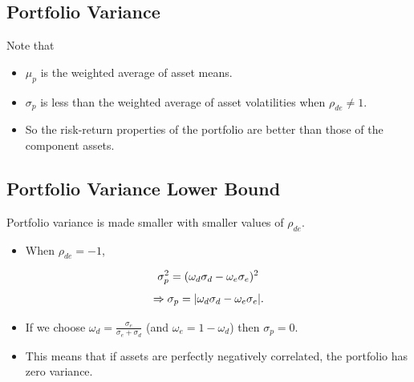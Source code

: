 \documentclass[letterpaper,10pt,english]{sphinxmanual}
\begin{document}
\subsection{Portfolio Variance}
\label{portfolioOpt:id4}
Note that
\begin{itemize}
\item {} 
$\mu_p$ is the weighted average of asset means.

\end{itemize}
\begin{itemize}
\item {} 
$\sigma_p$ is less than the weighted average of asset
volatilities when $\rho_{de} \neq 1$.

\end{itemize}
\begin{itemize}
\item {} 
So the risk-return properties of the portfolio are better than those
of the component assets.

\end{itemize}


\subsection{Portfolio Variance Lower Bound}
\label{portfolioOpt:portfolio-variance-lower-bound}
Portfolio variance is made smaller with smaller values of
$\rho_{de}$.
\begin{itemize}
\item {} 
When $\rho_{de} = -1$,

\end{itemize}
\begin{gather}
\begin{split}\sigma^2_p = (\omega_d \sigma_d - \omega_e \sigma_e)^2\end{split}\notag
\end{gather}\begin{gather}
\begin{split}\Rightarrow \sigma_p = |\omega_d \sigma_d - \omega_e \sigma_e|.\end{split}\notag
\end{gather}\begin{itemize}
\item {} 
If we choose $\omega_d = \frac{\sigma_e}{\sigma_e + \sigma_d}$
(and $\omega_e = 1-\omega_d$) then $\sigma_p = 0$.

\end{itemize}
\begin{itemize}
\item {} 
This means that if assets are perfectly negatively correlated, the
portfolio has zero variance.

\end{itemize}
\end{document}
